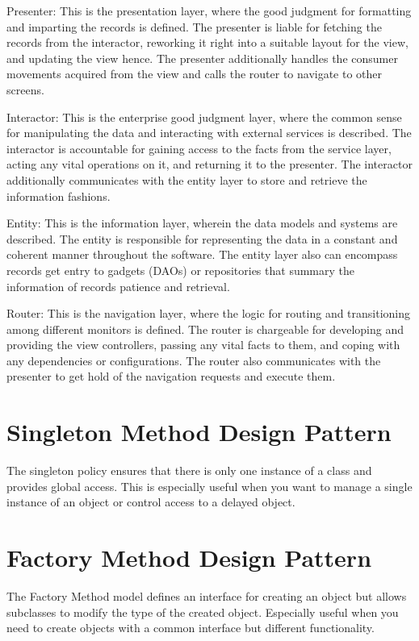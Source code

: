 \documentclass[conference]{IEEEtran}
\begin{document}
Presenter: This is the presentation layer, where the good judgment for formatting and imparting the records is defined. The presenter is liable for fetching the records from the interactor, reworking it right into a suitable layout for the view, and updating the view hence. The presenter additionally handles the consumer movements acquired from the view and calls the router to navigate to other screens.

Interactor: This is the enterprise good judgment layer, where the common sense for manipulating the data and interacting with external services is described. The interactor is accountable for gaining access to the facts from the service layer, acting any vital operations on it, and returning it to the presenter. The interactor additionally communicates with the entity layer to store and retrieve the information fashions.

Entity: This is the information layer, wherein the data models and systems are described. The entity is responsible for representing the data in a constant and coherent manner throughout the software. The entity layer also can encompass records get entry to gadgets (DAOs) or repositories that summary the information of records patience and retrieval.

Router: This is the navigation layer, where the logic for routing and transitioning among different monitors is defined. The router is chargeable for developing and providing the view controllers, passing any vital facts to them, and coping with any dependencies or configurations. The router also communicates with the presenter to get hold of the navigation requests and execute them.

\section{Singleton Method Design Pattern}
The singleton policy ensures that there is only one instance of a class and provides global access. This is especially useful when you want to manage a single instance of an object or control access to a delayed object.

\section{Factory Method Design Pattern}
The Factory Method model defines an interface for creating an object but allows subclasses to modify the type of the created object. Especially useful when you need to create objects with a common interface but different functionality.
\end{document}

